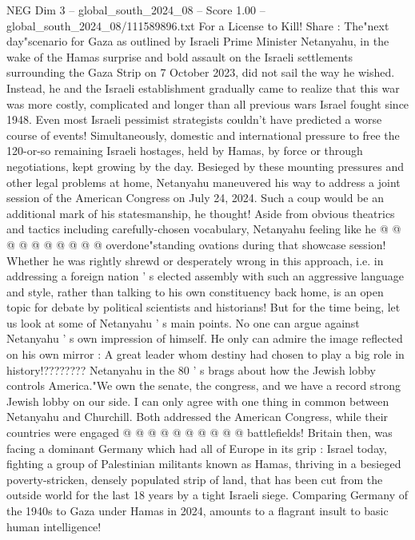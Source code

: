 \begin{textsample}{NEG Dim 3 – global\_south\_2024\_08 – Score 1.00 – global\_south\_2024\_08/111589896.txt}  \label{ex:f3_neg_129}
For a License to Kill!
Share : The"next day"scenario for Gaza as outlined by Israeli Prime Minister Netanyahu, in the wake of the Hamas surprise and bold assault on the Israeli settlements surrounding the Gaza Strip on 7 October 2023, did not sail the way he wished.
Instead, he and the Israeli establishment gradually came to realize that this war was more costly, complicated and longer than all previous wars Israel fought since 1948.
Even most Israeli pessimist strategists couldn't have predicted a worse course of events!
Simultaneously, domestic and international pressure to free the 120-or-so remaining Israeli hostages, held by Hamas, by force or through negotiations, kept growing by the day.
Besieged by these mounting pressures and other legal problems at home, Netanyahu maneuvered his way to address a joint session of the American Congress on July 24, 2024.
Such a coup would be an additional mark of his statesmanship, he thought!
Aside from obvious theatrics and tactics including carefully-chosen vocabulary, Netanyahu feeling like he @ @ @ @ @ @ @ @ @ @ overdone"standing ovations during that showcase session!
Whether he was rightly shrewd or desperately wrong in this approach, i.e. in addressing a foreign nation ' s elected assembly with such an aggressive language and style, rather than talking to his own constituency back home, is an open topic for debate by political scientists and historians!
But for the time being, let us look at some of Netanyahu ' s main points.
No one can argue against Netanyahu ' s own impression of himself.
He only can admire the image reflected on his own mirror : A great leader whom destiny had chosen to play a big role in history!????????
Netanyahu in the 80 ' s brags about how the Jewish lobby controls America."We own the senate, the congress, and we have a record strong Jewish lobby on our side.
I can only agree with one thing in common between Netanyahu and Churchill.
Both addressed the American Congress, while their countries were engaged @ @ @ @ @ @ @ @ @ @ battlefields!
Britain then, was facing a dominant Germany which had all of Europe in its grip : Israel today, fighting a group of Palestinian militants known as Hamas, thriving in a besieged poverty-stricken, densely populated strip of land, that has been cut from the outside world for the last 18 years by a tight Israeli siege.
Comparing Germany of the 1940s to Gaza under Hamas in 2024, amounts to a flagrant insult to basic human intelligence!

\end{textsample}
